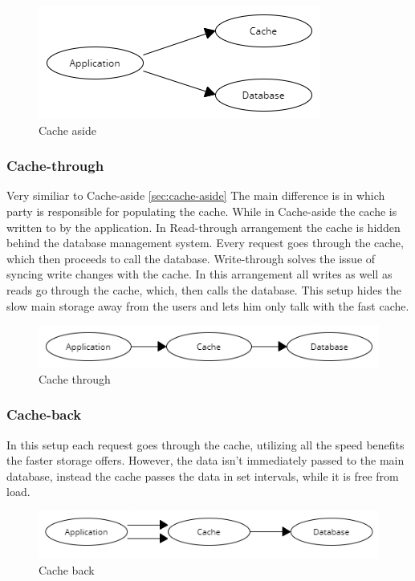 \documentclass[10pt,twoside,a4paper]{article}
\begin{document}
\begin{figure}[h]
    \centering
    \includegraphics[width=0.5\linewidth]{Cache-aside.png}
    \caption{Cache aside}
    \label{fig:cache-aside}
\end{figure}

\subsubsection{Cache-through}
Very similiar to Cache-aside \ref{sec:cache-aside} The main difference is in which party is responsible for populating the cache. While in Cache-aside the cache is written to by the application. In Read-through arrangement the cache is hidden behind the database management system. Every request goes through the cache, which then proceeds to call the database. Write-through solves the issue of syncing write changes with the cache. In this arrangement all writes as well as reads go through the cache, which, then calls the database. This setup hides the slow main storage away from the users and lets him only talk with the fast cache.

\begin{figure}[h]
    \centering
    \includegraphics[width=1\linewidth]{Cache-through.png}
    \caption{Cache through}
    \label{fig:cache-through}
\end{figure}

\subsubsection{Cache-back}
In this setup each request goes through the cache, utilizing all the speed benefits the faster storage offers. However, the data isn't immediately passed to the main database, instead the cache passes the data in set intervals, while it is free from load.

\begin{figure}[h]
    \centering
    \includegraphics[width=1\linewidth]{Cache-back.png}
    \caption{Cache back}
    \label{fig:cache-back}
\end{figure}
\end{document}
